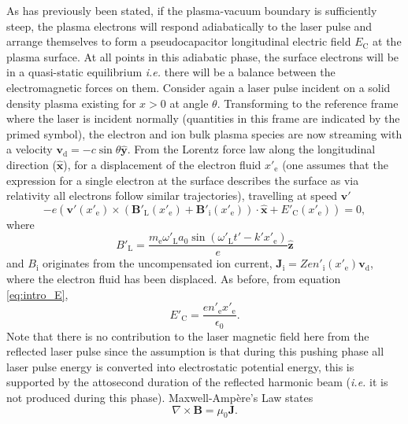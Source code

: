 As has previously been stated, if the plasma-vacuum boundary is sufficiently steep, the plasma electrons will respond adiabatically to the laser pulse and arrange themselves to form a pseudocapacitor longitudinal electric field $E_\mathrm{C}$ at the plasma surface. At all points in this adiabatic phase, the surface electrons will be in a quasi-static equilibrium \textit{i.e.} there will be a balance between the electromagnetic forces on them. Consider again a laser pulse incident on a solid density plasma existing for $x>0$ at angle $\theta$. Transforming to the reference frame where the laser is incident normally (quantities in this frame are indicated by the primed symbol), the electron and ion bulk plasma species are now streaming with a velocity $\mathbf{v}_\mathrm{d} = -c \sin\theta \hat{\mathbf{y}}$.  From the Lorentz force law along the longitudinal direction ($\hat{\mathbf{x}}$), for a displacement of the electron fluid $x'_\mathrm{e}$ (one assumes that the expression for a single electron at the surface describes the surface as via relativity all electrons follow similar trajectories), travelling at speed $\mathbf{v'}$
\begin{equation}\label{eq:zvp_eq}
	-e(\mathbf{v'}(x'_\mathrm{e})\times (\mathbf{B}'_\mathrm{L}(x'_\mathrm{e}) + \mathbf{B}'_\mathrm{i}(x'_\mathrm{e}))\cdot \hat{\mathbf{x}} + E'_\mathrm{C}(x'_\mathrm{e}) )= 0,
\end{equation}
where 
\begin{equation}\label{eq:zvp_Bl}
	B'_\mathrm{L} = \frac{m_\mathrm{e} \omega'_\mathrm{L}a_0\sin(\omega'_\mathrm{L}t'-k'x'_\mathrm{e})}{e} \hat{\mathbf{z}}
\end{equation}
and $B_\mathrm{i}$ originates from the uncompensated ion current, $\mathbf{J_\mathrm{i}} =  Zen'_\mathrm{i}(x'_\mathrm{e}) \mathbf{v}_\mathrm{d}$, where the electron fluid has been displaced. As before, from equation \ref{eq:intro_E},
\begin{equation}\label{eq:zvp_Ec}
	E'_\mathrm{C} = \frac{en'_\mathrm{e}x'_\mathrm{e}}{\epsilon_0}.
\end{equation}
Note that there is no contribution to the laser magnetic field here from the reflected laser pulse since the assumption is that during this pushing phase all laser pulse energy is converted into electrostatic potential energy, this is supported by the attosecond duration of the reflected harmonic beam (\textit{i.e.} it is not produced during this phase). Maxwell-Ampère's Law states
\begin{equation}\label{eq:zvp_maxwellampere}
	\nabla \times \mathbf{B} = \mu_0 \mathbf{J}.
\end{equation}

